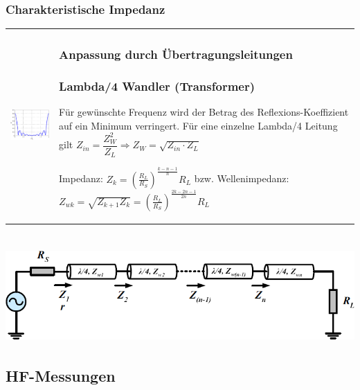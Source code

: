 \subsubsection{Charakteristische Impedanz }
\begin{tabular}{ll}
\parbox{6cm}{   
    \includegraphics[width=6cm]{./bilder/rfdesign_multistage_lambda-4_transformer_result.png}
    } 
& \parbox{12cm}{
    \subsubsection{Anpassung durch Übertragungsleitungen }

	\subsubsection{Lambda/4 Wandler (Transformer) }
	Für gewünschte Frequenz wird der Betrag des Reflexions-Koeffizient auf ein
	Minimum verringert. \\
	Für eine einzelne Lambda/4 Leitung gilt $Z_{in} = \dfrac{Z_W^2}{Z_L}
	\Rightarrow Z_W = \sqrt{Z_{in} \cdot Z_L}$  \\
	
    Impedanz: $Z_k = \left(\frac{R_L}{R_S}\right)^{\frac{k-n-1}n} R_L$  bzw. \\
    Wellenimpedanz: $Z_{wk} =
    \sqrt{Z_{k+1} Z_k} = \left(\frac{R_L}{R_S}\right)^{\frac{2k-2n-1}{2n}} R_L$ 
	} 
\end{tabular} \\
 \includegraphics[height=3.6cm]{./bilder/rfdesign_multistage_lambda-4_transformer.png}
\newpage

\subsection{HF-Messungen }
